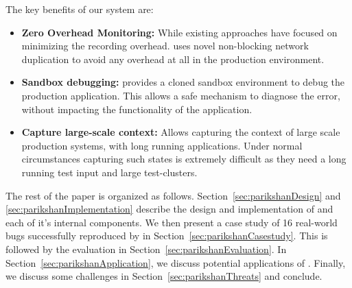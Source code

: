 \noindent
The key benefits of our system are:
\begin{itemize}[leftmargin=*,topsep=0pt,itemsep=-1ex,partopsep=1ex,parsep=1ex]
\item \textbf{Zero Overhead Monitoring:} While existing approaches have focused on minimizing the recording overhead. 
\parikshan uses novel non-blocking network duplication to avoid any overhead at all in the production environment.	
\item \textbf{Sandbox debugging:} \parikshan provides a cloned sandbox environment to debug the production application.
This allows a safe mechanism to diagnose the error, without impacting the functionality of the application.
\item \textbf{Capture large-scale context:} Allows capturing the context of large scale production systems, with long running applications. Under normal circumstances capturing such states is extremely difficult as they need a long running test input and large test-clusters.
\end{itemize}

\noindent
The rest of the paper is organized as follows.
Section~\ref{sec:parikshanDesign} and \ref{sec:parikshanImplementation} describe the design and implementation of \parikshan and each of it's internal components.
We then present a case study of 16 real-world bugs successfully reproduced by \parikshan in Section~\ref{sec:parikshanCasestudy}.
This is followed by the evaluation in Section~\ref{sec:parikshanEvaluation}.
In Section~\ref{sec:parikshanApplication}, we discuss potential applications of \parikshan. 
Finally, we discuss some challenges in Section~\ref{sec:parikshanThreats} and conclude.
